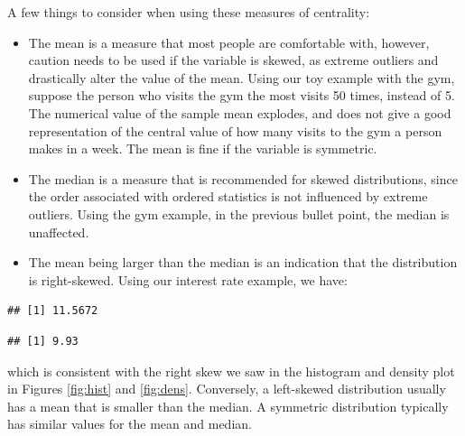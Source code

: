 \documentclass[
]{book}
\newenvironment{Shaded}{\begin{snugshade}}{\end{snugshade}}
\newcommand{\FunctionTok}[1]{\textcolor[rgb]{0.13,0.29,0.53}{\textbf{#1}}}
\newcommand{\NormalTok}[1]{#1}
\newcommand{\SpecialCharTok}[1]{\textcolor[rgb]{0.81,0.36,0.00}{\textbf{#1}}}
\begin{document}
A few things to consider when using these measures of centrality:

\begin{itemize}
\item
  The mean is a measure that most people are comfortable with, however, caution needs to be used if the variable is skewed, as extreme outliers and drastically alter the value of the mean. Using our toy example with the gym, suppose the person who visits the gym the most visits 50 times, instead of 5. The numerical value of the sample mean explodes, and does not give a good representation of the central value of how many visits to the gym a person makes in a week. The mean is fine if the variable is symmetric.
\item
  The median is a measure that is recommended for skewed distributions, since the order associated with ordered statistics is not influenced by extreme outliers. Using the gym example, in the previous bullet point, the median is unaffected.
\item
  The mean being larger than the median is an indication that the distribution is right-skewed. Using our interest rate example, we have:
\end{itemize}

\begin{Shaded}
\end{Shaded}

\begin{verbatim}
## [1] 11.5672
\end{verbatim}

\begin{Shaded}
\end{Shaded}

\begin{verbatim}
## [1] 9.93
\end{verbatim}

which is consistent with the right skew we saw in the histogram and density plot in Figures \ref{fig:hist} and \ref{fig:dens}. Conversely, a left-skewed distribution usually has a mean that is smaller than the median. A symmetric distribution typically has similar values for the mean and median.
\end{document}
